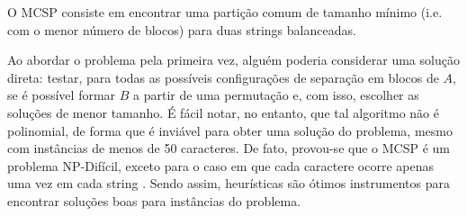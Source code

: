 



O MCSP consiste em encontrar uma partição comum de tamanho mínimo (i.e. com o menor número de blocos) para duas strings balanceadas.

Ao abordar o problema pela primeira vez, alguém poderia considerar uma solução direta: testar, para todas as possíveis configurações de separação em blocos de $A$, se é possível formar $B$ a partir de uma permutação e, com isso, escolher as soluções de menor tamanho. É fácil notar, no entanto, que tal algoritmo não é polinomial, de forma que é inviável para obter uma solução do problema, mesmo com instâncias de menos de 50 caracteres. De fato, provou-se que o MCSP é um problema NP-Difícil, exceto para o caso em que cada caractere ocorre apenas uma vez em cada string \cite{goldstein_minimum_2005}. Sendo assim, heurísticas são ótimos instrumentos para encontrar soluções boas para instâncias do problema.
